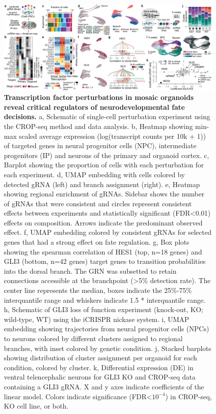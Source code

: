 \begin{figure}[b!]
    \centering
	\includegraphics[width=\textwidth]{figures/pando/Figure_3}
    \caption{\textbf{Transcription factor perturbations in mosaic organoids reveal critical regulators of neurodevelopmental fate decisions.}
    a, Schematic of single-cell perturbation experiment using the CROP-seq method and data analysis. b, Heatmap showing min-max scaled average expression (log(transcript counts per 10k + 1)) of targeted genes in neural progenitor cells (NPC), intermediate progenitors (IP) and neurons of the primary and organoid cortex. c,  Barplot showing the proportion of cells with each perturbation for each experiment. d, UMAP embedding with cells colored by detected gRNA (left) and branch assignment (right). e, Heatmap showing regional enrichment of gRNAs. Sidebar shows the number of gRNAs that were consistent and circles represent consistent effects between experiments and statistically significant (FDR<0.01) effects on composition. Arrows indicate the predominant observed effect. f, UMAP embedding colored by consistent gRNAs for selected genes that had a strong effect on fate regulation. g, Box plots showing the spearman correlation of HES1 (top, n=18 genes) and GLI3 (bottom, n=42 genes) target genes to transition probabilities into the dorsal branch. The GRN was subsetted to retain connections accessible at the branchpoint (>5\% detection rate). The center line represents the median, boxes indicate the 25\%-75\% interquantile range and whiskers indicate 1.5 * interquantile range. h, Schematic of GLI3 loss of function experiment (knock-out, KO; wild-type, WT) using the iCRISPR nickase system. i, UMAP embedding showing trajectories from neural progenitor cells (NPCs) to neurons colored by different clusters assigned to regional branches, with inset colored by genetic condition. j, Stacked barplots showing distribution of cluster assignment per organoid for each condition, colored by cluster. k, Differential expression (DE) in ventral telencephalic neurons for GLI3 KO and CROP-seq data containing a GLI3 gRNA. X and y axes indicate coefficients of the linear model. Colors indicate significance (FDR<$10^{-4}$) in CROP-seq, KO cell line, or both.}
    \label{fig:reg3}
\end{figure}

